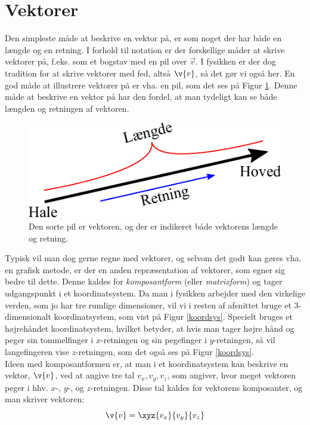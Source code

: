 \section{Vektorer}
Den simpleste måde at beskrive en vektor på, er som noget der har både en længde og en retning. I forhold til notation er der forskellige måder at skrive vektorer på, f.eks. som et bogstav med en pil over $\vec{v}$. I fysikken er der dog tradition for at skrive vektorer med fed, altså $\v{v}$, så det gør vi også her. En god måde at illustrere vektorer på er vha. en pil, som det ses på Figur \ref{vektorfig}. Denne måde at beskrive en vektor på har den fordel, at man tydeligt kan se både længden og retningen af vektoren.
\begin{figure}[h!]
	\centering
	\includegraphics[scale=0.6]{matematik/fig/vektor.pdf}
	\caption{Den sorte pil er vektoren, og der er indikeret både vektorens længde og retning. }
	\label{vektorfig}
\end{figure}
Typisk vil man dog gerne regne med vektorer, og selvom det godt kan gøres vha. en grafisk metode, er der en anden repræsentation af vektorer, som egner sig bedre til dette. Denne kaldes for \emph{komposantform} (eller \emph{matrixform})  og tager udgangspunkt i et koordinatsystem. Da man i fysikken arbejder med den virkelige verden, som jo har tre rumlige dimensioner, vil vi i resten af afsnittet bruge et 3-dimensionalt koordinatsystem, som vist på Figur \ref{koordsys}. Specielt bruges et højrehåndet koordinatsystem, hvilket betyder, at hvis man tager højre hånd og peger sin tommelfinger i $x$-retningen og sin pegefinger i $y$-retningen, så vil langefingeren vise $z$-retningen, som det også ses på Figur \ref{koordsys}.\\
Ideen med komposantformen er, at man i et koordinatsystem kan beskrive en vektor, $\v{v}$, ved at angive tre tal $v_x,  v_y,  v_z$, som angiver, hvor meget vektoren peger i hhv. $x$-, $y$-, og $z$-retningen. Disse tal kaldes for vektorens komposanter, og man skriver vektoren:
\begin{equation}
\v{v} = \xyz{v_x}{v_y}{v_z}
\end{equation}
